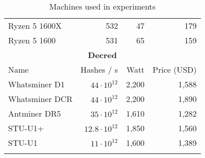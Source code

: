 \begin{longtable}{|p{}|r|r|r|}
  Ryzen 5 1600X & 532 & 47 & 179 \\
  Ryzen 5 1600 & 531 & 65 & 159 \\
  \hline
  \multicolumn{4}{|c|}{\textbf{Decred}} \\
  \hline
  Name & Hashes / s & Watt & Price (USD) \\
  \hhline{|=|=|=|=|}
  Whatsminer D1 & $44 \cdot 10^{12}$ & 2,200 & 1,588 \\
  Whatsminer DCR & $44 \cdot 10^{12}$ & 2,200 & 1,890 \\
  Antminer DR5 & $35 \cdot 10^{12}$ & 1,610 & 1,282 \\
  STU-U1+ & $12.8 \cdot 10^{12}$ & 1,850 & 1,560 \\
  STU-U1 & $11 \cdot 10^{12}$ & 1,600 & 1,389 \\
  \hline
\caption{Machines used in experiments}
\label{tbl:machines}
\end{longtable}
